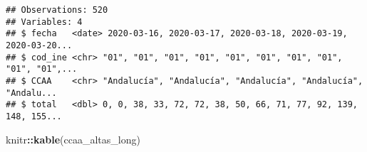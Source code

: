 \documentclass[
]{article}
\newenvironment{Shaded}{\begin{snugshade}}{\end{snugshade}}
\newcommand{\KeywordTok}[1]{\textcolor[rgb]{0.13,0.29,0.53}{\textbf{#1}}}
\newcommand{\NormalTok}[1]{#1}
\newcommand{\OperatorTok}[1]{\textcolor[rgb]{0.81,0.36,0.00}{\textbf{#1}}}
\begin{document}
\begin{verbatim}
## Observations: 520
## Variables: 4
## $ fecha   <date> 2020-03-16, 2020-03-17, 2020-03-18, 2020-03-19, 2020-03-20...
## $ cod_ine <chr> "01", "01", "01", "01", "01", "01", "01", "01", "01", "01",...
## $ CCAA    <chr> "Andalucía", "Andalucía", "Andalucía", "Andalucía", "Andalu...
## $ total   <dbl> 0, 0, 38, 33, 72, 72, 38, 50, 66, 71, 77, 92, 139, 148, 155...
\end{verbatim}

\begin{Shaded}
\begin{Highlighting}[]
\NormalTok{knitr}\OperatorTok{::}\KeywordTok{kable}\NormalTok{(ccaa_altas_long)}
\end{Highlighting}
\end{Shaded}
\end{document}
